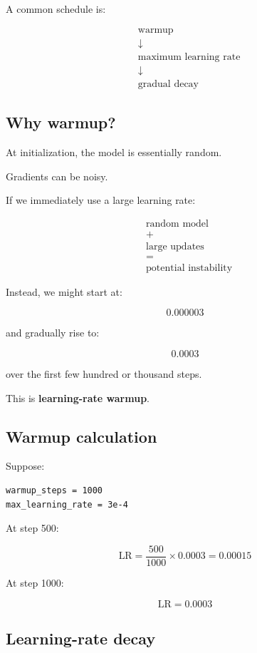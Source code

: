 A common schedule is:

\[
\begin{aligned}
&\text{warmup} \\
&\downarrow \\
&\text{maximum learning rate} \\
&\downarrow \\
&\text{gradual decay}
\end{aligned}
\]

\subsection{Why warmup?}

At initialization, the model is essentially random.

Gradients can be noisy.

If we immediately use a large learning rate:

\[
\begin{aligned}
&\text{random model} \\
&+ \\
&\text{large updates} \\
&= \\
&\text{potential instability}
\end{aligned}
\]

Instead, we might start at:

\[
  0.000003
\]

and gradually rise to:

\[
  0.0003
\]

over the first few hundred or thousand steps.

This is \textbf{learning-rate warmup}.

\subsection{Warmup calculation}

Suppose:

\begin{lstlisting}[style=shadedpython,language={}]
warmup_steps = 1000
max_learning_rate = 3e-4
\end{lstlisting}

At step 500:

\[
  \text{LR} = \frac{500}{1000} \times 0.0003 = 0.00015
\]

At step 1000:

\[
  \text{LR} = 0.0003
\]

\subsection{Learning-rate decay}

